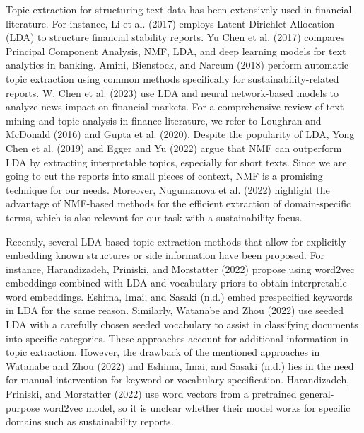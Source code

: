 \documentclass[
]{article}
\begin{document}
Topic extraction for structuring text data has been extensively used in financial literature. For instance, Li et al. (2017) employs Latent Dirichlet Allocation (LDA) to structure financial stability reports. Yu Chen et al. (2017) compares Principal Component Analysis, NMF, LDA, and deep learning models for text analytics in banking. Amini, Bienstock, and Narcum (2018) perform automatic topic extraction using common methods specifically for sustainability-related reports. W. Chen et al. (2023) use LDA and neural network-based models to analyze news impact on financial markets. For a comprehensive review of text mining and topic analysis in finance literature, we refer to Loughran and McDonald (2016) and Gupta et al. (2020). Despite the popularity of LDA, Yong Chen et al. (2019) and Egger and Yu (2022) argue that NMF can outperform LDA by extracting interpretable topics, especially for short texts. Since we are going to cut the reports into small pieces of context, NMF is a promising technique for our needs. Moreover, Nugumanova et al. (2022) highlight the advantage of NMF-based methods for the efficient extraction of domain-specific terms, which is also relevant for our task with a sustainability focus.

Recently, several LDA-based topic extraction methods that allow for explicitly embedding known structures or side information have been proposed. For instance, Harandizadeh, Priniski, and Morstatter (2022) propose using word2vec embeddings combined with LDA and vocabulary priors to obtain interpretable word embeddings. Eshima, Imai, and Sasaki (n.d.) embed prespecified keywords in LDA for the same reason. Similarly, Watanabe and Zhou (2022) use seeded LDA with a carefully chosen seeded vocabulary to assist in classifying documents into specific categories. These approaches account for additional information in topic extraction. However, the drawback of the mentioned approaches in Watanabe and Zhou (2022) and Eshima, Imai, and Sasaki (n.d.) lies in the need for manual intervention for keyword or vocabulary specification. Harandizadeh, Priniski, and Morstatter (2022) use word vectors from a pretrained general-purpose word2vec model, so it is unclear whether their model works for specific domains such as sustainability reports.
\end{document}
